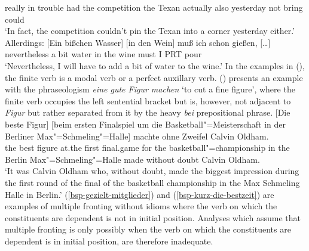        \spacebr{}really  \spacebr{}in trouble had the competition the Texan actually also yesterday not bring could\\
\glt `In fact, the competition couldn't pin the Texan into a corner yesterday either.'
\ex\label{ein-bisschen-wasser-in-den-wein}
\gll Allerdings: [Ein bißchen Wasser] [in den Wein] muß ich schon gießen, [\ldots]\footnotemark\\
     nevertheless  \spacebr{}a bit water  \spacebr{}in the wine must I PRT pour\\
\glt `Nevertheless, I will have to add a bit of water to the wine.'
\zl
In the examples in (), the finite verb is a modal verb or a perfect auxillary verb. ()
presents an example with the phraseologism \emph{eine gute Figur machen} `to cut a fine figure', where the finite verb occupies
the left sentential bracket but is, however, not adjacent to \emph{Figur} but rather separated from it by
the heavy \emph{bei} prepositional phrase.
\ea
\gll {}[Die beste Figur] [beim ersten Finalspiel um die Basketball"=Meisterschaft in der Berliner Max"=Schmeling"=Halle] machte ohne Zweifel Calvin Oldham.\footnotemark\\
	   \spacebr{}the best figure \spacebr{}at.the first final.game for the basketball"=championship in the Berlin Max"=Schmeling"=Halle made without doubt Calvin Oldham.\\
\glt `It was Calvin Oldham who, without doubt, made the biggest impression during the first round of the final of the basketball championship in the Max Schmeling Halle in Berlin.'
\z
(\ref{bsp-gezielt-mitglieder}) and %
(\ref{bsp-kurz-die-bestzeit}) are examples of multiple fronting without idioms where the verb on which the
constituents are dependent is not in initial position.
Analyses which assume that multiple fronting is only possibly when the verb on which the constituents
are dependent is in initial position, are therefore inadequate.

